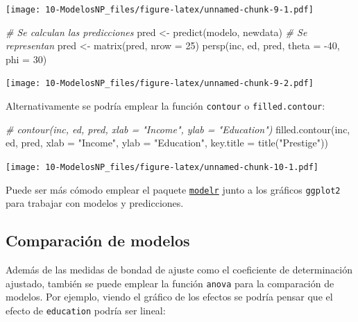 \documentclass[
]{book}
\newenvironment{Shaded}{\begin{snugshade}}{\end{snugshade}}
\newcommand{\AttributeTok}[1]{\textcolor[rgb]{0.77,0.63,0.00}{#1}}
\newcommand{\CommentTok}[1]{\textcolor[rgb]{0.56,0.35,0.01}{\textit{#1}}}
\newcommand{\DecValTok}[1]{\textcolor[rgb]{0.00,0.00,0.81}{#1}}
\newcommand{\FunctionTok}[1]{\textcolor[rgb]{0.00,0.00,0.00}{#1}}
\newcommand{\NormalTok}[1]{#1}
\newcommand{\OtherTok}[1]{\textcolor[rgb]{0.56,0.35,0.01}{#1}}
\newcommand{\SpecialCharTok}[1]{\textcolor[rgb]{0.00,0.00,0.00}{#1}}
\newcommand{\StringTok}[1]{\textcolor[rgb]{0.31,0.60,0.02}{#1}}
\theoremstyle{break}
\theoremstyle{nonumberplain}
\begin{document}
\texttt{[image: 10-ModelosNP\_files/figure-latex/unnamed-chunk-9-1.pdf]}

\begin{Shaded}
\begin{Highlighting}[]
\CommentTok{\# Se calculan las predicciones}
\NormalTok{pred }\OtherTok{\textless{}{-}} \FunctionTok{predict}\NormalTok{(modelo, newdata)}
\CommentTok{\# Se representan}
\NormalTok{pred }\OtherTok{\textless{}{-}} \FunctionTok{matrix}\NormalTok{(pred, }\AttributeTok{nrow =} \DecValTok{25}\NormalTok{)}
\FunctionTok{persp}\NormalTok{(inc, ed, pred, }\AttributeTok{theta =} \SpecialCharTok{{-}}\DecValTok{40}\NormalTok{, }\AttributeTok{phi =} \DecValTok{30}\NormalTok{)}
\end{Highlighting}
\end{Shaded}

\texttt{[image: 10-ModelosNP\_files/figure-latex/unnamed-chunk-9-2.pdf]}

Alternativamente se podría emplear la función \texttt{contour} o \texttt{filled.contour}:

\begin{Shaded}
\begin{Highlighting}[]
\CommentTok{\# contour(inc, ed, pred, xlab = "Income", ylab = "Education")}
\FunctionTok{filled.contour}\NormalTok{(inc, ed, pred, }\AttributeTok{xlab =} \StringTok{"Income"}\NormalTok{, }\AttributeTok{ylab =} \StringTok{"Education"}\NormalTok{, }\AttributeTok{key.title =} \FunctionTok{title}\NormalTok{(}\StringTok{"Prestige"}\NormalTok{))}
\end{Highlighting}
\end{Shaded}

\texttt{[image: 10-ModelosNP\_files/figure-latex/unnamed-chunk-10-1.pdf]}

Puede ser más cómodo emplear el paquete \href{https://github.com/hadley/modelr}{\texttt{modelr}} junto a los gráficos \texttt{ggplot2} para trabajar con modelos y predicciones.

\hypertarget{comparaciuxf3n-de-modelos}{%
\subsection{Comparación de modelos}\label{comparaciuxf3n-de-modelos}}

Además de las medidas de bondad de ajuste como el coeficiente de determinación ajustado, también se puede emplear la función \texttt{anova} para la comparación de modelos.
Por ejemplo, viendo el gráfico de los efectos se podría pensar que el efecto de \texttt{education} podría ser lineal:
\end{document}
